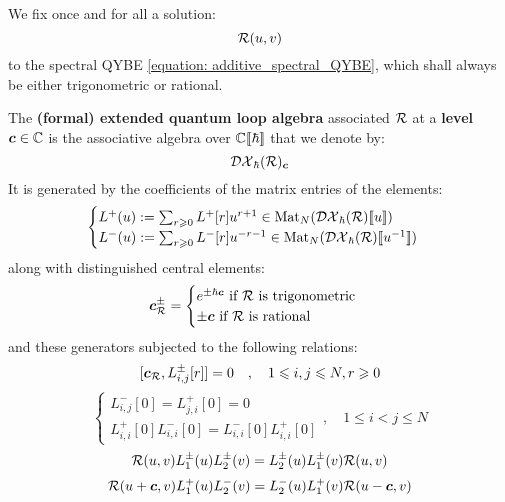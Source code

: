         We fix once and for all a solution:
            $$\mathcal{R}(u, v)$$
        to the spectral QYBE \eqref{equation: additive_spectral_QYBE}, which shall always be either trigonometric or rational.

        \begin{definition} \label{def: extended_loop_QUEs_R_matrix_presentation}
            The \textbf{(formal) extended quantum loop algebra} associated $\mathcal{R}$ at a \textbf{level} $\boldsymbol{c} \in \mathbb{C}$ is the associative algebra over $\mathbb{C}[\![\hbar]\!]$ that we denote by:
                $$\mathcal{DX}_{\hbar}(\mathcal{R})_{\boldsymbol{c}}$$
            It is generated by the coefficients of the matrix entries of the elements:
                \begin{equation} \label{equation: RLL_creation_annihilation_operators}
                    \begin{cases}
                        L^+(u) := \sum_{r \geqslant 0} L^+[r] u^{r + 1} \in \operatorname{Mat}_N( \mathcal{DX}_{\hbar}(\mathcal{R})[\![u]\!] )
                        \\
                        L^-(u) := \sum_{r \geqslant 0} L^-[r] u^{-r - 1} \in \operatorname{Mat}_N( \mathcal{DX}_{\hbar}(\mathcal{R})[\![u^{-1}]\!] )
                    \end{cases}
                \end{equation}
            along with distinguished central elements:
                \begin{equation} \label{equation: extended_loop_QUE_level}
                    \boldsymbol{c}_{\mathcal{R}}^{\pm} =
                    \begin{cases}
                        \text{$e^{\pm \hbar \boldsymbol{c}}$ if $\mathcal{R}$ is trigonometric}
                        \\
                        \text{$\pm \boldsymbol{c}$ if $\mathcal{R}$ is rational}
                    \end{cases}
                \end{equation}
            and these generators subjected to the following relations:
                $$[ \boldsymbol{c}_{\mathcal{R}}, L^{\pm}_{i, j}[r] ] = 0 \quad, \quad 1 \leqslant i, j \leqslant N, r \geqslant 0$$
                \begin{equation}
                    \begin{cases}
                        L_{i, j}^-[0] = L_{j, i}^+[0] = 0
                        \\
                        L_{i, i}^+[0] L_{i, i}^-[0] = L_{i, i}^-[0] L_{i, i}^+[0]
                    \end{cases}
                    , \quad 1 \leq i < j \leq N
                \end{equation}
                \begin{equation} \label{equation: extended_loop_QUE_RLL_relation}
                    \mathcal{R}(u, v) L_1^{\pm}(u) L_2^{\pm}(v) = L_2^{\pm}(u) L_1^{\pm}(v) \mathcal{R}(u, v)
                \end{equation}
                \begin{equation} \label{equation: extended_loop_QUEs_mixed_relation}
                    \mathcal{R}(u + \boldsymbol{c}, v) L_1^+(u) L_2^-(v) = L_2^-(u) L_1^+(v) \mathcal{R}(u - \boldsymbol{c}, v)
                \end{equation}
        \end{definition}
